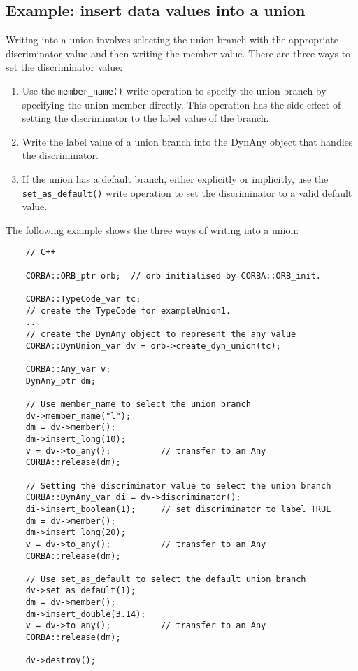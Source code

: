 \documentclass[11pt,twoside,onecolumn]{book}
\begin{document}
\subsection{Example: insert data values into a union}

Writing into a union involves selecting the union branch with the
appropriate discriminator value and then writing the member value.
There are three ways to set the discriminator value:

\begin{enumerate}
\item Use the {\tt member\_name()} write operation to specify the union
branch by specifying the union member directly. This operation has the side
effect of setting the discriminator to the label value of the
branch.
\item Write the label value of a union branch into the DynAny
object that handles the discriminator.
\item If the union has a default branch, either explicitly or implicitly,
use the {\tt set\_as\_default()} write operation to set the discriminator
to a valid default value.
\end{enumerate}

The following example shows the three ways of writing into a union:

{\small
\begin{verbatim}
    // C++
    
    CORBA::ORB_ptr orb;  // orb initialised by CORBA::ORB_init.
    
    CORBA::TypeCode_var tc;
    // create the TypeCode for exampleUnion1.
    ...
    // create the DynAny object to represent the any value
    CORBA::DynUnion_var dv = orb->create_dyn_union(tc);
    
    CORBA::Any_var v;
    DynAny_ptr dm;
    
    // Use member_name to select the union branch
    dv->member_name("l");
    dm = dv->member();
    dm->insert_long(10);
    v = dv->to_any();          // transfer to an Any
    CORBA::release(dm);
    
    // Setting the discriminator value to select the union branch
    CORBA::DynAny_var di = dv->discriminator();
    di->insert_boolean(1);     // set discriminator to label TRUE
    dm = dv->member();
    dm->insert_long(20);
    v = dv->to_any();          // transfer to an Any
    CORBA::release(dm);
    
    // Use set_as_default to select the default union branch
    dv->set_as_default(1);
    dm = dv->member();
    dm->insert_double(3.14);
    v = dv->to_any();          // transfer to an Any
    CORBA::release(dm);
    
    dv->destroy();

\end{verbatim}
}
\end{document}
